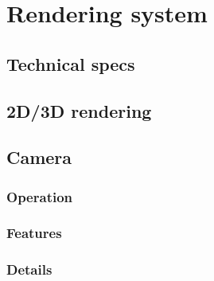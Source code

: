 \section{Rendering system} %
\subsection{Technical specs} %

\subsection{2D/3D rendering} %

\subsection{Camera} %
\subsubsection{Operation} %

\subsubsection{Features} %

\subsubsection{Details} %